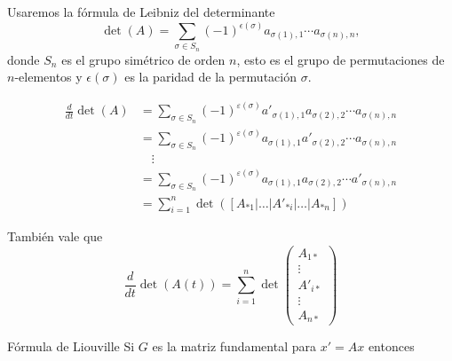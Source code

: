 \begin{demo} Usaremos la fórmula de Leibniz del determinante
\[
\det(A)=\sum_{\sigma \in S_n}(-1)^{\epsilon(\sigma)} a_{\sigma(1),1} \cdots a_{\sigma(n),n},
\]
donde $S_n$ es el grupo simétrico de orden $n$, esto es el grupo de permutaciones de $n$-elementos y $\epsilon(\sigma)$ es la paridad de la permutación $\sigma$. 


\[
\begin{split}
 \frac{d}{dt} \det(A)&=\sum_{\sigma \in S_{n}}(-1)^{\varepsilon(\sigma)} a'_{\sigma(1),1} a_{\sigma(2),2} \cdots a_{\sigma(n),n}\\
 &=\sum_{\sigma \in S_{n}}(-1)^{\varepsilon(\sigma)} a_{\sigma(1),1} a'_{\sigma(2),2} \cdots a_{\sigma(n),n}\\
   &\quad \vdots \\
 &=\sum_{\sigma \in S_{n}}(-1)^{\varepsilon(\sigma)} a_{\sigma(1),1} a_{\sigma(2),2} \cdots a'_{\sigma(n),n}\\
 &=\sum_{i=1}^n\det(\left[A_{*1}|\ldots|A'_{*i}|\ldots| A_{* n}\right])
\end{split}
\]
\end{demo}

\begin{observa} También vale que
\begin{equation}\label{eq:form_det2}
\frac{d}{dt}\det( A(t))=\sum_{i=1}^n\det
    \begin{pmatrix} A_{1*}\\ 
                    \vdots \\
                    A'_{i*} \\
                    \vdots\\
                    A_{n*}
    \end{pmatrix}
\end{equation}
 
\end{observa}


\begin{teorema}{Fórmula de Liouville} Si $G$ es la matriz fundamental para $x'=Ax$ entonces


 
\end{teorema}

